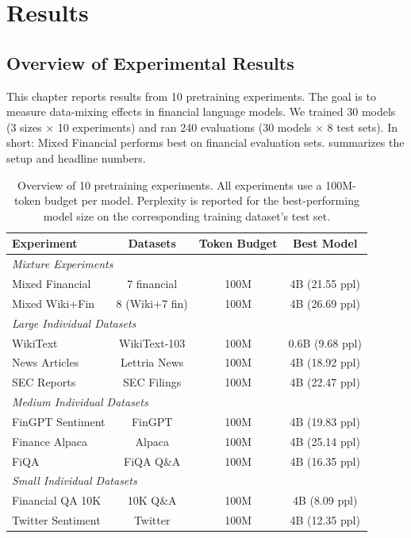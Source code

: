 \chapter{Results}


\section{Overview of Experimental Results}

This chapter reports results from 10 pretraining experiments. The goal is to measure data-mixing effects in financial language models. We trained 30 models (3 sizes $\times$ 10 experiments) and ran 240 evaluations (30 models $\times$ 8 test sets). In short: Mixed Financial performs best on financial evaluation sets.  summarizes the setup and headline numbers.

\begin{table}[h]
\centering
\small
\begin{tabular}{lccc}
\toprule
\textbf{Experiment} & \textbf{Datasets} & \textbf{Token Budget} & \textbf{Best Model} \\
\midrule
\multicolumn{4}{l}{\textit{Mixture Experiments}} \\
Mixed Financial & 7 financial & 100M & 4B (21.55 ppl) \\
Mixed Wiki+Fin & 8 (Wiki+7 fin) & 100M & 4B (26.69 ppl) \\
\midrule
\multicolumn{4}{l}{\textit{Large Individual Datasets}} \\
WikiText & WikiText-103 & 100M & 0.6B (9.68 ppl) \\
News Articles & Lettria News & 100M & 4B (18.92 ppl) \\
SEC Reports & SEC Filings & 100M & 4B (22.47 ppl) \\
\midrule
\multicolumn{4}{l}{\textit{Medium Individual Datasets}} \\
FinGPT Sentiment & FinGPT & 100M & 4B (19.83 ppl) \\
Finance Alpaca & Alpaca & 100M & 4B (25.14 ppl) \\
FiQA & FiQA Q\&A & 100M & 4B (16.35 ppl) \\
\midrule
\multicolumn{4}{l}{\textit{Small Individual Datasets}} \\
Financial QA 10K & 10K Q\&A & 100M & 4B (8.09 ppl) \\
Twitter Sentiment & Twitter & 100M & 4B (12.35 ppl) \\
\bottomrule
\end{tabular}
\caption[Overview of Pretraining Experiments]{Overview of 10 pretraining experiments. All experiments use a 100M-token budget per model. Perplexity is reported for the best-performing model size on the corresponding training dataset's test set.}
\label{tab:experiments_overview}
\end{table}

